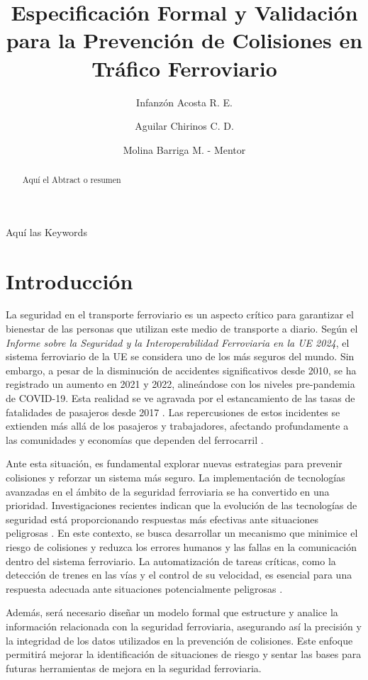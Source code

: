 \documentclass[journal]{IEEEtran}
\title{Especificación Formal y Validación para la Prevención de Colisiones en Tráfico Ferroviario}
\author[1]{Infanzón Acosta R. E.}
\author[1]{Aguilar Chirinos C. D.}
\affil{Universidad La Salle, Arequipa, Perú}
\author[2]{Molina Barriga M. - Mentor }
\begin{document}
 

\maketitle

\begin{abstract}
Aquí el Abtract o resumen
\end{abstract}

\begin{IEEEkeywords}
Aquí las Keywords
\end{IEEEkeywords}

\section{Introducción}  
La seguridad en el transporte ferroviario es un aspecto crítico para garantizar el bienestar de las personas que utilizan este medio de transporte a diario. Según el \textit{Informe sobre la Seguridad y la Interoperabilidad Ferroviaria en la UE 2024}, el sistema ferroviario de la UE se considera uno de los más seguros del mundo. Sin embargo, a pesar de la disminución de accidentes significativos desde 2010, se ha registrado un aumento en 2021 y 2022, alineándose con los niveles pre-pandemia de COVID-19. Esta realidad se ve agravada por el estancamiento de las tasas de fatalidades de pasajeros desde 2017 \cite{eu2024}. Las repercusiones de estos incidentes se extienden más allá de los pasajeros y trabajadores, afectando profundamente a las comunidades y economías que dependen del ferrocarril \cite{carrington2019}.  

Ante esta situación, es fundamental explorar nuevas estrategias para prevenir colisiones y reforzar un sistema más seguro. La implementación de tecnologías avanzadas en el ámbito de la seguridad ferroviaria se ha convertido en una prioridad. Investigaciones recientes indican que la evolución de las tecnologías de seguridad está proporcionando respuestas más efectivas ante situaciones peligrosas \cite{decel2021safety}. En este contexto, se busca desarrollar un mecanismo que minimice el riesgo de colisiones y reduzca los errores humanos y las fallas en la comunicación dentro del sistema ferroviario. La automatización de tareas críticas, como la detección de trenes en las vías y el control de su velocidad, es esencial para una respuesta adecuada ante situaciones potencialmente peligrosas \cite{automation2020}.  

Además, será necesario diseñar un modelo formal que estructure y analice la información relacionada con la seguridad ferroviaria, asegurando así la precisión y la integridad de los datos utilizados en la prevención de colisiones. Este enfoque permitirá mejorar la identificación de situaciones de riesgo y sentar las bases para futuras herramientas de mejora en la seguridad ferroviaria.  
\end{document}
